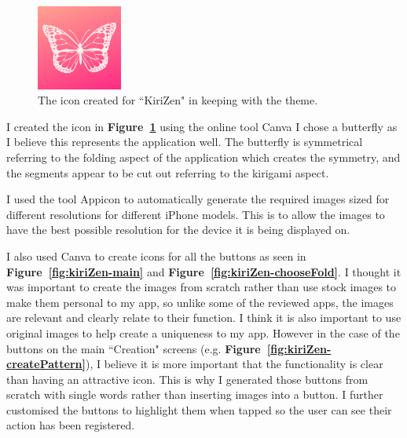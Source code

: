 \documentclass[11pt]{article}
\begin{document}
                \paragraph{}

        \begin{figure}
                        \centering
                        \includegraphics[width=0.25\textwidth]{KiriZen/icon.png}
                        \caption{The icon created for ``KiriZen" in keeping with the theme.}
                        \label{fig:icon}
                    \end{figure}
            I created the icon in \textbf{Figure~\ref{fig:icon}} using the online tool Canva %
            I chose a butterfly as I believe this represents the application well. The butterfly is symmetrical referring to the folding aspect of the application which creates the symmetry, and the segments appear to be cut out referring to the kirigami aspect.
            
            I used the tool Appicon %
            to automatically generate the required images sized for different resolutions for different iPhone models. This is to allow the images to have the best possible resolution for the device it is being displayed on.
        
            I also used Canva to create icons for all the buttons as  seen in \textbf{Figure~\ref{fig:kiriZen-main}} and \textbf{Figure~\ref{fig:kiriZen-chooseFold}}. I thought it was important to create the images from scratch rather than use stock images to make them personal to my app, so unlike some of the reviewed apps, the images are relevant and clearly relate to their function. I think it is also important to use original images to help create a uniqueness to my app. However in the case of the buttons on the main ``Creation" screens (e.g. \textbf{Figure~\ref{fig:kiriZen-createPattern}}), I believe it is more important that the functionality is clear than having an attractive icon. This is why I generated those buttons from scratch with single words rather than inserting images into a button. I further customised the buttons to highlight them when tapped so the user can see their action has been registered.
            
\end{document}
